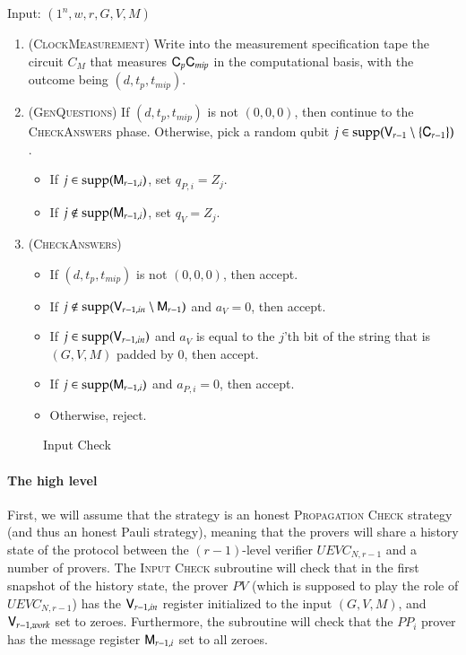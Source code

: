 \vspace{10pt}
\begin{center}
\begin{mdframed}
    Input: $(1^n,w,r,G,V,M)$
    
	\begin{enumerate}
		\item (\textsc{ClockMeasurement}) Write into the measurement specification tape the circuit $C_M$ that measures ${\mathsf{C}}_p {\mathsf{C}}_{mip}$ in the computational basis, with the outcome being $(d,t_p,t_{mip})$.
		\item (\textsc{GenQuestions}) If $(d,t_p,t_{mip})$ is not $(0,0,0)$, then continue to the \textsc{CheckAnswers} phase. Otherwise, pick a random qubit $j \in \operatorname{supp}({\mathsf{V}}_{r-1} \setminus \{{\mathsf{C}}_{r-1} \})$. 
		\begin{itemize}
			\item If $j \in \operatorname{supp}({\mathsf{M}}_{r-1,i})$, set $q_{P,i} = Z_j$.
			\item If $j \notin \operatorname{supp}({\mathsf{M}}_{r-1,i})$, set $q_V = Z_j$.
		\end{itemize}
		
		\item (\textsc{CheckAnswers}) 
		\begin{itemize}
			\item If $(d,t_p,t_{mip})$ is not $(0,0,0)$, then accept. 
			\item If $j \notin \operatorname{supp}({\mathsf{V}}_{r-1,in} \setminus {\mathsf{M}}_{r-1})$ and $a_V = 0$, then accept. 
			\item If $j \in \operatorname{supp}({\mathsf{V}}_{r-1,in})$ and $a_V$ is equal to the $j$'th bit of the string that is $(G,V,M)$ padded by $0$, then accept. 
			\item If $j \in \operatorname{supp}({\mathsf{M}}_{r-1,i})$ and $a_{P,i} = 0$, then accept.
			\item Otherwise, reject.
		\end{itemize}
	\end{enumerate}    
\end{mdframed}
\end{center}
\begin{figure}[H]
\caption{Input Check}
\label{fig:input_check}
\end{figure}

\paragraph{The high level} First, we will assume that the strategy is an honest \textsc{Propagation Check} strategy (and thus an honest Pauli strategy), meaning that the provers will share a history state of the protocol between the $(r-1)$-level verifier $UEVC_{N,r-1}$ and a number of provers. The \textsc{Input Check} subroutine will check that in the first snapshot of the history state, the prover $PV$ (which is supposed to play the role of $UEVC_{N,r-1}$) has the ${\mathsf{V}}_{r-1,in}$ register initialized to the input $(G,V,M)$, and ${\mathsf{V}}_{r-1,work} $ set to zeroes. Furthermore, the subroutine will check that the $PP_i$ prover has the message register ${\mathsf{M}}_{r-1,i}$ set to all zeroes.

